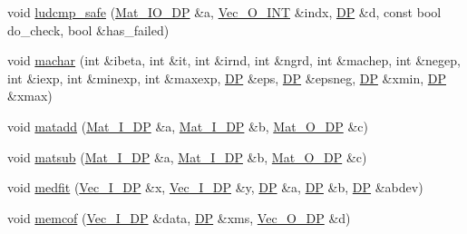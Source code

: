 \begin{DoxyCompactItemize}
\item 
void \mbox{\hyperlink{namespaceNR_a03fd0ba9f0721c1fe3355bd81704727d}{ludcmp\+\_\+safe}} (\mbox{\hyperlink{namespaceNR_ad1513aa4697878ed3bff0b8b3c9dd910}{Mat\+\_\+\+I\+O\+\_\+\+DP}} \&a, \mbox{\hyperlink{namespaceNR_ade2338f6d53b7da3dd6d1c04804541f2}{Vec\+\_\+\+O\+\_\+\+I\+NT}} \&indx, \mbox{\hyperlink{namespaceNR_af6ff762dd605ff477b8e52387253a02a}{DP}} \&d, const bool do\+\_\+check, bool \&has\+\_\+failed)
\item 
void \mbox{\hyperlink{namespaceNR_ac38efbaed34a2e071711a215801215fd}{machar}} (int \&ibeta, int \&it, int \&irnd, int \&ngrd, int \&machep, int \&negep, int \&iexp, int \&minexp, int \&maxexp, \mbox{\hyperlink{namespaceNR_af6ff762dd605ff477b8e52387253a02a}{DP}} \&eps, \mbox{\hyperlink{namespaceNR_af6ff762dd605ff477b8e52387253a02a}{DP}} \&epsneg, \mbox{\hyperlink{namespaceNR_af6ff762dd605ff477b8e52387253a02a}{DP}} \&xmin, \mbox{\hyperlink{namespaceNR_af6ff762dd605ff477b8e52387253a02a}{DP}} \&xmax)
\item 
void \mbox{\hyperlink{namespaceNR_a3e83e821eb8a08def3eb745893d705f0}{matadd}} (\mbox{\hyperlink{namespaceNR_a2b8abfda8fffad6ba0a1b5a4c0773dbf}{Mat\+\_\+\+I\+\_\+\+DP}} \&a, \mbox{\hyperlink{namespaceNR_a2b8abfda8fffad6ba0a1b5a4c0773dbf}{Mat\+\_\+\+I\+\_\+\+DP}} \&b, \mbox{\hyperlink{namespaceNR_adc1f8da33094b6bbeb1f5f899515ce54}{Mat\+\_\+\+O\+\_\+\+DP}} \&c)
\item 
void \mbox{\hyperlink{namespaceNR_a3813813f04cdd8f245c3aa44ff4f445d}{matsub}} (\mbox{\hyperlink{namespaceNR_a2b8abfda8fffad6ba0a1b5a4c0773dbf}{Mat\+\_\+\+I\+\_\+\+DP}} \&a, \mbox{\hyperlink{namespaceNR_a2b8abfda8fffad6ba0a1b5a4c0773dbf}{Mat\+\_\+\+I\+\_\+\+DP}} \&b, \mbox{\hyperlink{namespaceNR_adc1f8da33094b6bbeb1f5f899515ce54}{Mat\+\_\+\+O\+\_\+\+DP}} \&c)
\item 
void \mbox{\hyperlink{namespaceNR_aab044381afb3d475fea1f56f27b43677}{medfit}} (\mbox{\hyperlink{namespaceNR_a9f943da53862537c552e2a770cb170ae}{Vec\+\_\+\+I\+\_\+\+DP}} \&x, \mbox{\hyperlink{namespaceNR_a9f943da53862537c552e2a770cb170ae}{Vec\+\_\+\+I\+\_\+\+DP}} \&y, \mbox{\hyperlink{namespaceNR_af6ff762dd605ff477b8e52387253a02a}{DP}} \&a, \mbox{\hyperlink{namespaceNR_af6ff762dd605ff477b8e52387253a02a}{DP}} \&b, \mbox{\hyperlink{namespaceNR_af6ff762dd605ff477b8e52387253a02a}{DP}} \&abdev)
\item 
void \mbox{\hyperlink{namespaceNR_a160cae226a21c3be206ce06f63125499}{memcof}} (\mbox{\hyperlink{namespaceNR_a9f943da53862537c552e2a770cb170ae}{Vec\+\_\+\+I\+\_\+\+DP}} \&data, \mbox{\hyperlink{namespaceNR_af6ff762dd605ff477b8e52387253a02a}{DP}} \&xms, \mbox{\hyperlink{namespaceNR_a970094d23441f8ef6a45282a7eb2103d}{Vec\+\_\+\+O\+\_\+\+DP}} \&d)

\end{DoxyCompactItemize}
